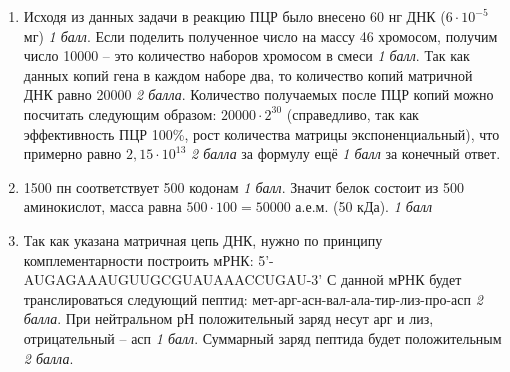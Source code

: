 \solutionSection

\begin{enumerate}
    \item Исходя из данных задачи в реакцию ПЦР было внесено 60 нг ДНК ($6 \cdot 10^{-5}$ мг) \textit{1 балл}. 
    Если поделить полученное число на массу 46 хромосом, получим число 10000 – это количество наборов 
    хромосом в смеси \textit{1 балл}. Так как данных копий гена в каждом наборе два, то количество копий матричной 
    ДНК равно 20000 \textit{2 балла}. Количество получаемых после ПЦР копий можно посчитать следующим образом: 
    $20000 \cdot 2^{30}$ (справедливо, так как эффективность ПЦР 100\%, рост количества матрицы экспоненциальный), 
    что примерно равно $2,15 \cdot 10^{13}$ \textit{2 балла} за формулу ещё \textit{1 балл} за конечный ответ.
    \item 1500 пн соответствует 500 кодонам \textit{1 балл}. Значит белок состоит из 500 
    аминокислот, масса равна $500 \cdot 100 = 50000$ а.е.м. (50 кДа). \textit{1 балл}
    \item Так как указана матричная цепь ДНК, нужно по принципу комплементарности построить мРНК: 5’-AUGAGAAAUGUUGCGUAUAAACCUGAU-3’
    С данной мРНК будет транслироваться следующий пептид: мет-арг-асн-вал-ала-тир-лиз-про-асп \textit{2 балла}. При нейтральном рН положительный заряд несут арг и лиз, отрицательный – асп \textit{1 балл}. Суммарный заряд пептида будет положительным \textit{2 балла}.
\end{enumerate}